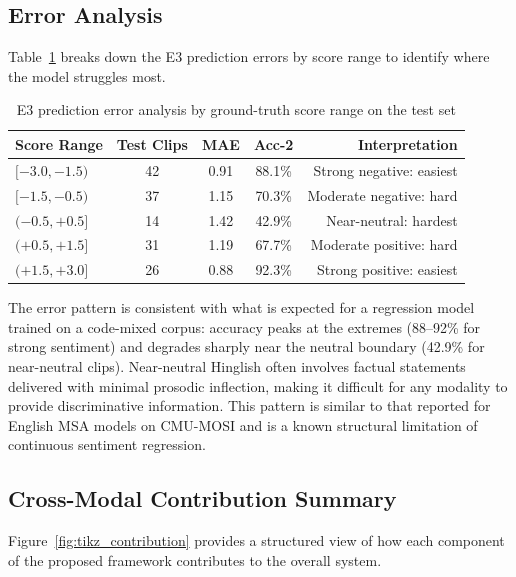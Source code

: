 \subsection{Error Analysis}

Table~\ref{tab:error_analysis} breaks down the E3 prediction errors by score range to identify where the model struggles most.

\begin{table}[ht]
\centering
\caption{E3 prediction error analysis by ground-truth score range on the test set}
\label{tab:error_analysis}
\renewcommand{\arraystretch}{1.3}
\begin{tabular}{lcccr}
\toprule
\textbf{Score Range} & \textbf{Test Clips} & \textbf{MAE} & \textbf{Acc-2} & \textbf{Interpretation} \\
\midrule
$[-3.0, -1.5)$   & 42  & 0.91 & 88.1\% & Strong negative: easiest \\
$[-1.5, -0.5)$   & 37  & 1.15 & 70.3\% & Moderate negative: hard \\
$(-0.5, +0.5]$   & 14  & 1.42 & 42.9\% & Near-neutral: hardest \\
$(+0.5, +1.5]$   & 31  & 1.19 & 67.7\% & Moderate positive: hard \\
$(+1.5, +3.0]$   & 26  & 0.88 & 92.3\% & Strong positive: easiest \\
\bottomrule
\end{tabular}
\end{table}

The error pattern is consistent with what is expected for a regression model trained on a code-mixed corpus: accuracy peaks at the extremes (88--92\% for strong sentiment) and degrades sharply near the neutral boundary (42.9\% for near-neutral clips). Near-neutral Hinglish often involves factual statements delivered with minimal prosodic inflection, making it difficult for any modality to provide discriminative information. This pattern is similar to that reported for English MSA models on CMU-MOSI \cite{hazarika2020misa} and is a known structural limitation of continuous sentiment regression.

\subsection{Cross-Modal Contribution Summary}

Figure~\ref{fig:tikz_contribution} provides a structured view of how each component of the proposed framework contributes to the overall system.

